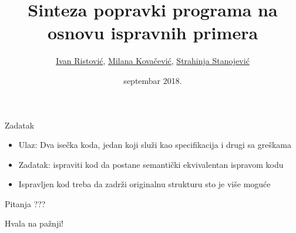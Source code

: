 \documentclass{beamer}
\title{Sinteza popravki programa na osnovu ispravnih primera}
\author{\href{mailto:mi14031@matf.bg.ac.rs}{Ivan Ristović}, \href{mailto:mi14042@matf.bg.ac.rs}{Milana Kovačević}, \href{mailto:mi14207@matf.bg.ac.rs}{Strahinja Stanojević}
}
\date{septembar 2018.}
\begin{document}
\begin{frame}
    \titlepage
\end{frame}

\begin{frame}{Zadatak}
    \begin{itemize}
        \item Ulaz: Dva ise\v{c}ka koda, jedan koji slu\v{z}i kao specifikacija i drugi sa gre\v{s}kama
        \item Zadatak: ispraviti kod da postane semanti\v{c}ki ekvivalentan ispravom kodu
        \item Ispravljen kod treba da zadr\v{z}i originalnu strukturu sto je vi\v{s}e mogu\'c{}e
    \end{itemize}
\end{frame}










\begin{frame}{Pitanja}
    \centering
    ???
\end{frame}

\begin{frame}{}
    \centering
    Hvala na pa\v{z}nji!
\end{frame}
\end{document}
